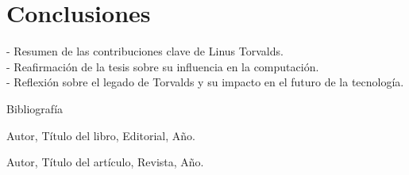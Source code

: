 \documentclass[a4paper,12pt]{article}
\begin{document}
\section{Conclusiones} - Resumen de las contribuciones clave de Linus
Torvalds.\\ - Reafirmación de la tesis sobre su influencia en la computación.\\
- Reflexión sobre el legado de Torvalds y su impacto en el futuro de la
tecnología.

Bibliografía
\newpage
\begin{thebibliography}{9}
    Autor, Título del libro, Editorial, Año.

    Autor, Título del artículo, Revista, Año.
\end{thebibliography}
\end{document}
